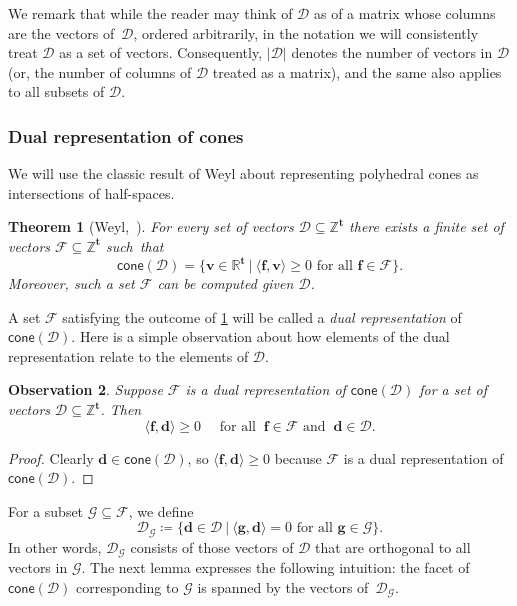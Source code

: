 \documentclass{article}
\newtheorem{theorem}{Theorem}\newtheorem{lemma}[theorem]{Lemma}\newtheorem{proposition}[theorem]{Proposition}\newtheorem{corollary}[theorem]{Corollary}\newtheorem{definition}[theorem]{Definition}\newtheorem{claim}[theorem]{Claim}\newtheorem{remark}[theorem]{Remark}\newtheorem{observation}[theorem]{Observation}\newtheorem{conjecture}[theorem]{Conjecture}\newtheorem{example}[theorem]{Example}
\renewcommand{\geq}{\geqslant}
\newcommand{\Dd}{\mathcal{D}}
\newcommand{\Z}{\mathbb{Z}}
\newcommand{\R}{\mathbb{R}}
\newcommand{\tup}[1]{{\mathbf{#1}}}
\newcommand{\tv}{\tup t}
\newcommand{\ff}{\tup f}
\renewcommand{\gg}{\tup g}
\newcommand{\dd}{\tup d}
\newcommand{\myvv}{\tup v} %
\newcommand{\Ff}{\mathcal{F}}
\newcommand{\Gg}{\mathcal{G}}
\newcommand{\sca}[2]{\langle #1,#2\rangle}
\newcommand{\realcone}{\mathsf{cone}}
\begin{document}
We remark that while the reader may think of $\Dd$ as of a matrix whose columns are the vectors of~$\Dd$, ordered arbitrarily, in the notation we will consistently treat $\Dd$ as a set of vectors. Consequently, $|\Dd|$ denotes the number of vectors in $\Dd$ (or, the number of columns of $\Dd$ treated as a matrix), and the same also applies to all subsets of $\Dd$.

\subsubsection{Dual representation of cones}

We will use the classic result of Weyl about representing polyhedral cones as intersections of half-spaces.

\begin{theorem}[Weyl,~\cite{Weyl35}]\label{thm:weyl}
 For every set of vectors $\Dd\subseteq \Z^\tv$ there exists a finite set of vectors $\Ff\subseteq \Z^\tv$ such~that
 $$\realcone(\Dd)=\{\myvv\in \R^{\tv}~|~\sca{\ff}{\myvv}\geq 0\textrm{ for all }\ff\in \Ff\}.$$
 Moreover, such a set $\Ff$ can be computed given $\Dd$.
\end{theorem}

A set $\Ff$ satisfying the outcome of \cref{thm:weyl} will be called a {\em{dual representation}} of $\realcone(\Dd)$. Here is a simple observation about how elements of the dual representation relate to the elements of $\Dd$.

\begin{observation}\label{obs:dualPositive}
 Suppose $\Ff$ is a dual representation of $\realcone(\Dd)$ for a set of vectors $\Dd\subseteq \Z^\tv$. Then
 $$\sca{\ff}{\dd}\geq 0\quad \textrm{ for all }\ \ff\in \Ff \textrm{ and }\ \dd\in \Dd.$$
\end{observation}
\begin{proof}
 Clearly $\dd\in \realcone(\Dd)$, so $\sca{\ff}{\dd}\geq 0$ because $\Ff$ is a dual representation of $\realcone(\Dd)$.
\end{proof}

For a subset $\Gg\subseteq \Ff$, we define
$$\Dd_\Gg \coloneqq \{\dd\in \Dd~|~\sca{\gg}{\dd}=0\textrm{ for all }\gg\in \Gg\}.$$
In other words, $\Dd_\Gg$ consists of those vectors of $\Dd$ that are orthogonal to all vectors in $\Gg$. The next lemma expresses the following intuition: the facet of $\realcone(\Dd)$ corresponding to $\Gg$ is spanned by the vectors of~$\Dd_\Gg$.
\end{document}
